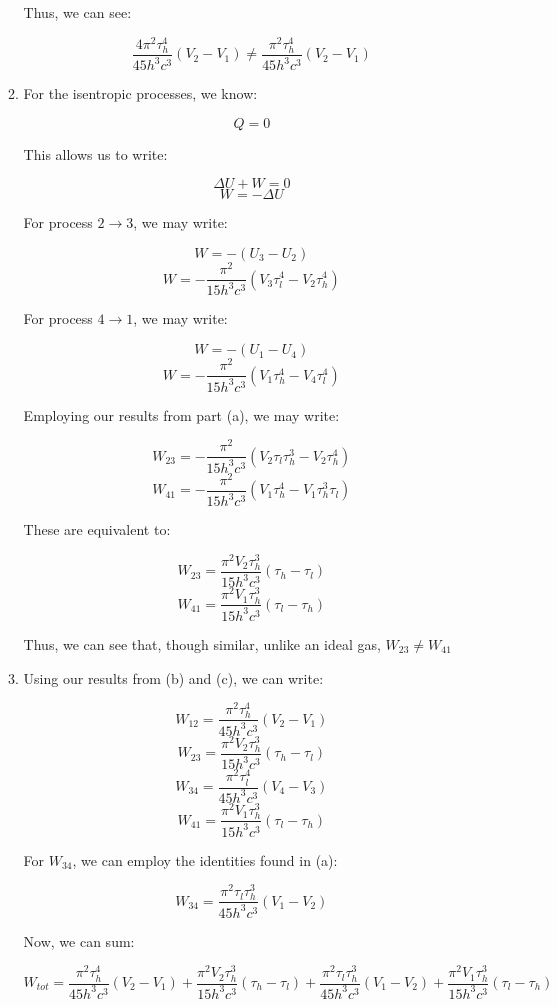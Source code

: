 \begin{enumerate}
\begin{enumerate}
        Thus, we can see:

        $$\boxed{\frac{4\pi^2\tau_h^4}{45h^3c^3}(V_2-V_1)\neq\frac{\pi^2\tau_h^4}{45h^3c^3}(V_2-V_1)}$$
        
      \item 

        For the isentropic processes, we know:

        $$Q=0$$

        This allows us to write:

        $$\Delta U+W=0$$
        $$W=-\Delta U$$

        For process $2\to3$, we may write:

        $$W=-(U_3-U_2)$$
        $$W=-\frac{\pi^2}{15h^3c^3}(V_3\tau_l^4-V_2\tau_h^4)$$

        For process $4\to1$, we may write:

        $$W=-(U_1-U_4)$$
        $$W=-\frac{\pi^2}{15h^3c^3}(V_1\tau_h^4-V_4\tau_l^4)$$

        Employing our results from part (a), we may write:

        $$W_{23}=-\frac{\pi^2}{15h^3c^3}(V_2\tau_l\tau_h^3-V_2\tau_h^4)$$
        $$W_{41}=-\frac{\pi^2}{15h^3c^3}(V_1\tau_h^4-V_1\tau_h^3\tau_l)$$

        These are equivalent to:

        $$W_{23}=\frac{\pi^2V_2\tau_h^3}{15h^3c^3}(\tau_h-\tau_l)$$
        $$W_{41}=\frac{\pi^2V_1\tau_h^3}{15h^3c^3}(\tau_l-\tau_h)$$

        Thus, we can see that, though similar, unlike an ideal gas, $\boxed{W_{23}\neq W_{41}}$
        
      \item 

        Using our results from (b) and (c), we can write:

        $$W_{12}=\frac{\pi^2\tau_h^4}{45h^3c^3}(V_2-V_1)$$
        $$W_{23}=\frac{\pi^2V_2\tau_h^3}{15h^3c^3}(\tau_h-\tau_l)$$
        $$W_{34}=\frac{\pi^2\tau_l^4}{45h^3c^3}(V_4-V_3)$$
        $$W_{41}=\frac{\pi^2V_1\tau_h^3}{15h^3c^3}(\tau_l-\tau_h)$$

        For $W_{34}$, we can employ the identities found in (a):

        $$W_{34}=\frac{\pi^2\tau_l\tau_h^3}{45h^3c^3}(V_1-V_2)$$

        Now, we can sum:

        $$W_{tot}=\frac{\pi^2\tau_h^4}{45h^3c^3}(V_2-V_1)+\frac{\pi^2V_2\tau_h^3}{15h^3c^3}(\tau_h-\tau_l)+\frac{\pi^2\tau_l\tau_h^3}{45h^3c^3}(V_1-V_2)+\frac{\pi^2V_1\tau_h^3}{15h^3c^3}(\tau_l-\tau_h)$$


\end{enumerate}
\end{enumerate}
